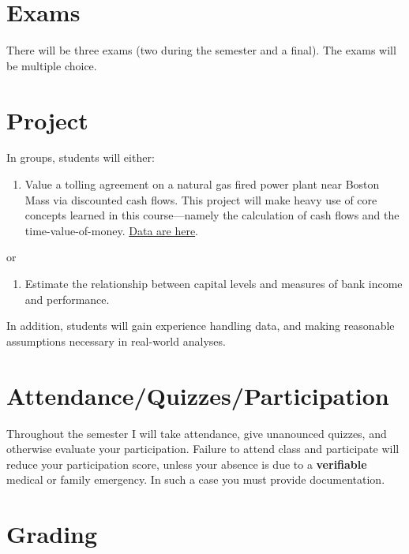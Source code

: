 \documentclass[11pt]{article}
\begin{document}
\section{Exams}
\label{sec:org0d59cc0}

There will be three exams (two during the semester and a final).  The exams will be multiple choice.

\section{Project}
\label{sec:orga5dce80}

In groups, students will either:

\begin{enumerate}
\item Value a tolling agreement on a natural gas fired power plant near Boston Mass via discounted cash flows.  This project will make heavy use of core concepts learned in this course---namely the calculation of cash flows and the time-value-of-money.  \href{https://www.eia.gov/electricity/wholesale/\#history}{Data are here}.
\end{enumerate}

or 

\begin{enumerate}
\item Estimate the relationship between capital levels and measures of bank income and performance.
\end{enumerate}

In addition, students will gain experience handling data, and making reasonable assumptions necessary in real-world analyses.

\section{Attendance/Quizzes/Participation}
\label{sec:org9bb0eb0}

Throughout the semester I will take attendance, give unanounced quizzes, and otherwise evaluate your participation.  Failure to attend class and participate will reduce your participation score, unless your absence is due to a \textbf{\textbf{verifiable}} medical or family emergency.  In such a case you must provide documentation.

\section{Grading}
\label{sec:orgff371bc}
\end{document}
